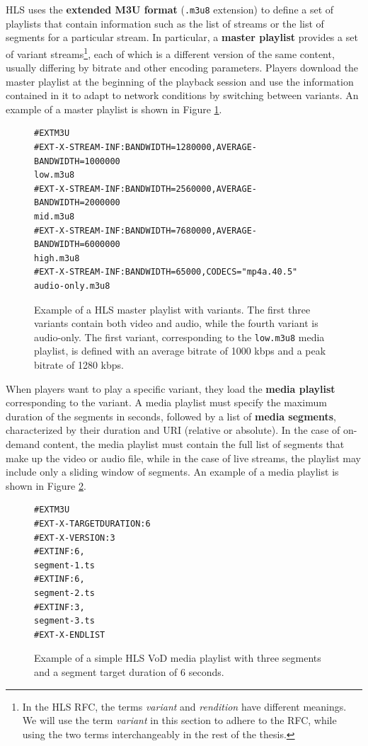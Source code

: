 HLS uses the \textbf{extended M3U format} (\texttt{.m3u8} extension) to define a set of playlists that contain information such as the list of streams or the list of segments for a particular stream. In particular, a \textbf{master playlist} provides a set of variant streams\footnote{In the HLS RFC, the terms \textit{variant} and \textit{rendition} have different meanings. We will use the term \textit{variant} in this section to adhere to the RFC, while using the two terms interchangeably in the rest of the thesis.}, each of which is a different version of the same content, usually differing by bitrate and other encoding parameters. Players download the master playlist at the beginning of the playback session and use the information contained in it to adapt to network conditions by switching between variants. An example of a master playlist is shown in Figure \ref{fig:hls_master}.

\begin{figure}[h]
    \centering
    \begin{verbatim}
#EXTM3U
#EXT-X-STREAM-INF:BANDWIDTH=1280000,AVERAGE-BANDWIDTH=1000000
low.m3u8
#EXT-X-STREAM-INF:BANDWIDTH=2560000,AVERAGE-BANDWIDTH=2000000
mid.m3u8
#EXT-X-STREAM-INF:BANDWIDTH=7680000,AVERAGE-BANDWIDTH=6000000
high.m3u8
#EXT-X-STREAM-INF:BANDWIDTH=65000,CODECS="mp4a.40.5"
audio-only.m3u8
    \end{verbatim}
	\caption{Example of a HLS master playlist with variants. The first three variants contain both video and audio, while the fourth variant is audio-only. The first variant, corresponding to the \texttt{low.m3u8} media playlist, is defined with an average bitrate of 1000 kbps and a peak bitrate of 1280 kbps.}
	\label{fig:hls_master}
\end{figure}

When players want to play a specific variant, they load the \textbf{media playlist} corresponding to the variant. A media playlist must specify the maximum duration of the segments in seconds, followed by a list of \textbf{media segments}, characterized by their duration and URI (relative or absolute). In the case of on-demand content, the media playlist must contain the full list of segments that make up the video or audio file, while in the case of live streams, the playlist may include only a sliding window of segments. An example of a media playlist is shown in Figure \ref{fig:hls_media}.

\begin{figure}[h]
    \centering
    \begin{verbatim}
#EXTM3U
#EXT-X-TARGETDURATION:6
#EXT-X-VERSION:3
#EXTINF:6,
segment-1.ts
#EXTINF:6,
segment-2.ts
#EXTINF:3,
segment-3.ts
#EXT-X-ENDLIST
    \end{verbatim}
	\caption{Example of a simple HLS VoD media playlist with three segments and a segment target duration of 6 seconds.}
	\label{fig:hls_media}
\end{figure}

